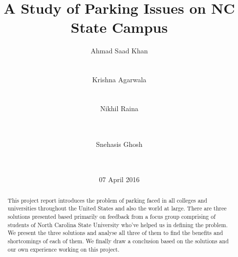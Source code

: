 \documentclass{acm_proc_article-sp}
\begin{document}
\title{A Study of Parking Issues on NC State Campus}

\author{
\alignauthor
Ahmad Saad Khan\\ %
       \\
       \\
\alignauthor
Krishna Agarwala\\
       \\
       \\
\alignauthor
Nikhil Raina\\
       \\
       \\
\and %
\alignauthor
Snehasis Ghosh\\
       \\
       \\
}

\date{07 April 2016}


\maketitle
\begin{abstract}
This project report introduces the problem of parking faced in all colleges and universities throughout the United States and also the world at large. There are three solutions presented based primarily on feedback from a focus group comprising of students of North Carolina State University who've helped us in defining the problem. We present the three solutions and analyse all three of them to find the benefits and shortcomings of each of them. We finally draw a conclusion based on the solutions and our own experience working on this project.
\end{abstract}

\end{document}
